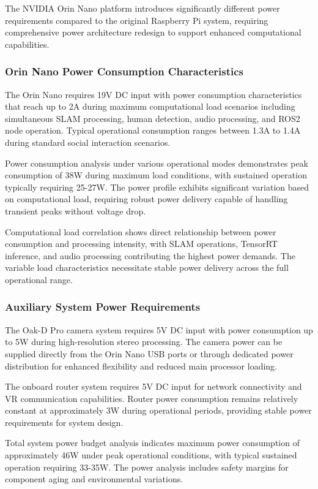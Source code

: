 The NVIDIA Orin Nano platform introduces significantly different power requirements compared to the original Raspberry Pi system, requiring comprehensive power architecture redesign to support enhanced computational capabilities.

\subsubsection{Orin Nano Power Consumption Characteristics}

The Orin Nano requires 19V DC input with power consumption characteristics that reach up to 2A during maximum computational load scenarios including simultaneous SLAM processing, human detection, audio processing, and ROS2 node operation. Typical operational consumption ranges between 1.3A to 1.4A during standard social interaction scenarios.

Power consumption analysis under various operational modes demonstrates peak consumption of 38W during maximum load conditions, with sustained operation typically requiring 25-27W. The power profile exhibits significant variation based on computational load, requiring robust power delivery capable of handling transient peaks without voltage drop.

Computational load correlation shows direct relationship between power consumption and processing intensity, with SLAM operations, TensorRT inference, and audio processing contributing the highest power demands. The variable load characteristics necessitate stable power delivery across the full operational range.

\subsubsection{Auxiliary System Power Requirements}

The Oak-D Pro camera system requires 5V DC input with power consumption up to 5W during high-resolution stereo processing. The camera power can be supplied directly from the Orin Nano USB ports or through dedicated power distribution for enhanced flexibility and reduced main processor loading.

The onboard router system requires 5V DC input for network connectivity and VR communication capabilities. Router power consumption remains relatively constant at approximately 3W during operational periods, providing stable power requirements for system design.

Total system power budget analysis indicates maximum power consumption of approximately 46W under peak operational conditions, with typical sustained operation requiring 33-35W. The power analysis includes safety margins for component aging and environmental variations.

